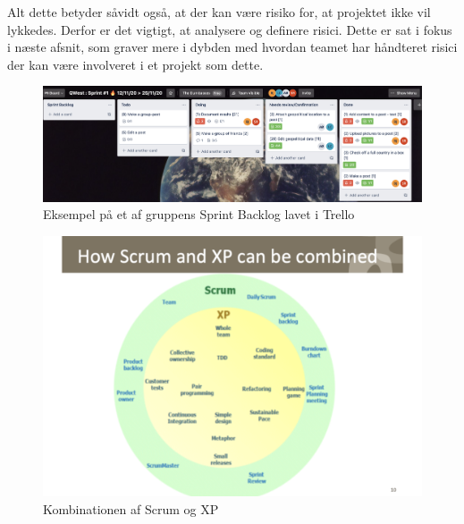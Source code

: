 Alt dette betyder såvidt også, at der kan være risiko for, at projektet ikke vil lykkedes. Derfor er det vigtigt, at analysere og definere risici. Dette er sat i fokus i næste afsnit, som graver mere i dybden med hvordan teamet har håndteret risici der kan være involveret i et projekt som dette.


\begin{figure}
    \includegraphics[width=\linewidth]{figures/SprintBacklog.png}
    \caption{Eksempel på et af gruppens Sprint Backlog lavet i Trello}
    \label{fig:Sprint}
\end{figure}


\begin{figure}
    \includegraphics[width=\linewidth]{figures/XP&Scrum.png}
    \caption{Kombinationen af Scrum og XP}
    \label{fig:Kombi}
\end{figure}


